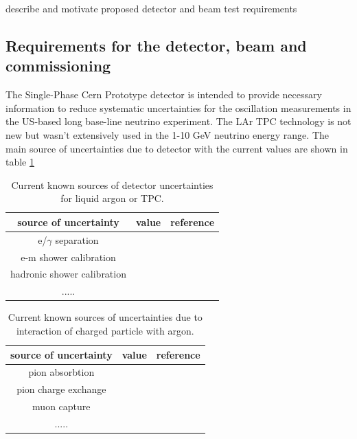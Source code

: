 describe and motivate proposed detector and beam test requirements 


\subsection{Requirements for the detector, beam and commissioning}
The Single-Phase Cern Prototype detector is intended to provide necessary information to reduce systematic uncertainties for the oscillation measurements in the US-based long base-line neutrino experiment.   The LAr TPC technology is not new but wasn't extensively used in the 1-10 GeV neutrino energy range.  The main source of uncertainties due to detector with the current values are shown in table \ref{table:deterr}


\begin{table}[h]
\centering
\caption{Current known sources of detector uncertainties for liquid argon or TPC.}
\label{table:deterr}
\begin{tabular}{|c|c|c|}
\hline
\textbf{source of uncertainty } & \textbf{value} & \textbf{reference}  \\ \hline
  e/$\gamma$ separation        &           &                   \\ \hline
  e-m shower calibration        &           &            \\ \hline
   hadronic shower calibration       &           &        \\ \hline
 .....   &   &   \\ \hline
\end{tabular}
\end{table}



\begin{table}[h]
\centering
\caption{Current known sources of  uncertainties due to interaction of charged particle with argon.}
\label{table:physicserr}
\begin{tabular}{|c|c|c|}
\hline
\textbf{source of uncertainty } & \textbf{value} & \textbf{reference}  \\ \hline
 pion absorbtion       &           &                   \\ \hline
 pion charge exchange       &           &            \\ \hline
 muon capture       &           &        \\ \hline
 .....   &   &   \\ \hline
\end{tabular}
\end{table}



